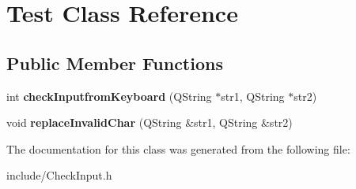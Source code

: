 \hypertarget{classTest}{}\section{Test Class Reference}
\label{classTest}
\subsection*{Public Member Functions}
\begin{DoxyCompactItemize}
\item 
\mbox{\label{classTest_a3b223ab01f34445e73b914b48a2ff7fc}} 
int {\bfseries check\+Inputfrom\+Keyboard} (Q\+String $\ast$str1, Q\+String $\ast$str2)
\item 
\mbox{\label{classTest_a83a0f09e6583bf623f84f0caa50342d9}} 
void {\bfseries replace\+Invalid\+Char} (Q\+String \&str1, Q\+String \&str2)
\end{DoxyCompactItemize}


The documentation for this class was generated from the following file\+:\begin{DoxyCompactItemize}
\item 
include/Check\+Input.\+h\end{DoxyCompactItemize}
